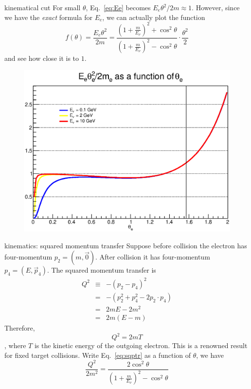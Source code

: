 \documentclass{beamer}
\begin{document}
\begin{frame}[allowframebreaks]{kinematical cut}
  For small $\theta$, Eq.~\eqref{eq:Ee} becomes $E_e\theta^2/2m\approx 1$. However, since we have the \emph{exact} formula for $E_e$, we can actually plot the function
\begin{equation} \label{eq:exact_cut_function}
  f(\theta)=\frac{E_e\theta^2}{2m}=\frac{\left( 1+\frac{m}{E_\nu} \right)^2+\cos^2\theta}{\left( 1+\frac{m}{E_\nu} \right)^2-\cos^2\theta}\cdot\frac{\theta^2}{2}
\end{equation}
and see how close it is to $1$.

\framebreak
\begin{figure}
\centering
  \includegraphics[width=\textwidth]{figures/cut_func_with_angle.eps}
\end{figure}

\end{frame}

\begin{frame}[allowframebreaks]{kinematics: squared momentum transfer}
\scriptsize
Suppose before collision the electron has four-momentum $p_2=(m,\vec{0})$. After collision it has four-momentum $p_4=(E,\vec{p}_4)$. The squared momentum transfer is
\begin{eqnarray*}
  Q^2 & \equiv & -(p_2-p_4)^2 \\
  &=&-(p_2^2+p_4^2-2p_2\cdot p_4) \\
  &=&2mE-2m^2 \\
  &=&2m(E-m)
\end{eqnarray*}
Therefore,
\begin{equation} \label{eq:sqptr}
  \boxed{Q^2=2mT}
\end{equation}
, where $T$ is the kinetic energy of the outgoing electron. This is a renowned result for fixed target collisions. Write Eq.~\eqref{eq:sqptr} as a function of $\theta$, we have
\begin{equation}
  \frac{Q^2}{2m^2}=\frac{2\cos^2\theta}{\left( 1+\frac{m}{E_\nu} \right)^2-\cos^2\theta}
\end{equation}
\end{frame}
\end{document}
